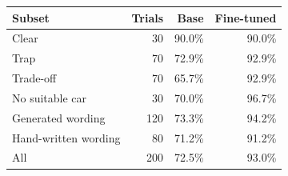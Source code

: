 \begin{tabular}{lrrr}
\toprule
Subset & Trials & Base & Fine-tuned \\
\midrule
Clear & 30 & 90.0\% & 90.0\% \\
Trap & 70 & 72.9\% & 92.9\% \\
Trade-off & 70 & 65.7\% & 92.9\% \\
No suitable car & 30 & 70.0\% & 96.7\% \\
\midrule
Generated wording & 120 & 73.3\% & 94.2\% \\
Hand-written wording & 80 & 71.2\% & 91.2\% \\
\midrule
All & 200 & 72.5\% & 93.0\% \\
\bottomrule
\end{tabular}
